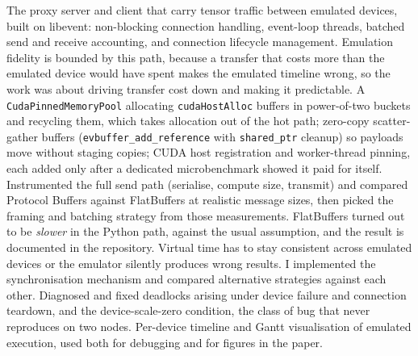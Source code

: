 \documentclass[letterpaper,11pt]{article}
\begin{document}
\begin{itemize}[leftmargin=*]
    {The proxy server and client that carry tensor traffic between emulated devices, built on libevent: non-blocking connection handling, event-loop threads, batched send and receive accounting, and connection lifecycle management. Emulation fidelity is bounded by this path, because a transfer that costs more than the emulated device would have spent makes the emulated timeline wrong, so the work was about driving transfer cost down and making it predictable.}
    {A \texttt{CudaPinnedMemoryPool} allocating \texttt{cudaHostAlloc} buffers in power-of-two buckets and recycling them, which takes allocation out of the hot path; zero-copy scatter-gather buffers (\texttt{evbuffer\_add\_reference} with \texttt{shared\_ptr} cleanup) so payloads move without staging copies; CUDA host registration and worker-thread pinning, each added only after a dedicated microbenchmark showed it paid for itself.}
    {Instrumented the full send path (serialise, compute size, transmit) and compared Protocol Buffers against FlatBuffers at realistic message sizes, then picked the framing and batching strategy from those measurements. FlatBuffers turned out to be \textit{slower} in the Python path, against the usual assumption, and the result is documented in the repository.}
    {Virtual time has to stay consistent across emulated devices or the emulator silently produces wrong results. I implemented the synchronisation mechanism and compared alternative strategies against each other.}
    {Diagnosed and fixed deadlocks arising under device failure and connection teardown, and the device-scale-zero condition, the class of bug that never reproduces on two nodes.}
    {Per-device timeline and Gantt visualisation of emulated execution, used both for debugging and for figures in the paper.}
\end{itemize}
\end{document}
